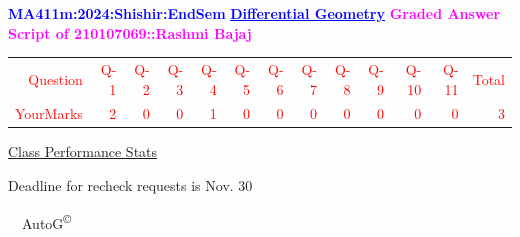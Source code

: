 \documentclass{article}                              %
\begin{document}
%
\vspace*{1in}

\begin{center}
	\textbf{\textcolor{blue}{\LARGE MA411m:2024:Shishir:EndSem}}
	\vskip 1cm
	\textbf{\textcolor{blue}{\underline{\Large Differential Geometry}}}
	\vskip 1cm
	\textbf{\textcolor{magenta}{\LARGE Graded Answer Script of 210107069::Rashmi Bajaj}}
\end{center}


\begin{center}
	\Huge 
	\textcolor{red}{
	\begin{tabular}{*{13}{r}}
		Question&Q-1& Q-2& Q-3& Q-4& Q-5& Q-6& Q-7& Q-8& Q-9& Q-10& Q-11&Total  \\
        	YourMarks&2&0&0&1&0&0&0&0&0&0&0&3
	\end{tabular}
	}
        \vskip 2cm
	\large
	\underline{Class Performance Stats}
	\DTLsetseparator{;}
	\begin{table}[htbp]
		\centering
	\end{table}
	\vskip 1cm
	Deadline for recheck requests is Nov. 30
\end{center}
\ \vfill \ \hfill \small AutoG\textsuperscript{\copyright}
\newpage
%
\end{document}
